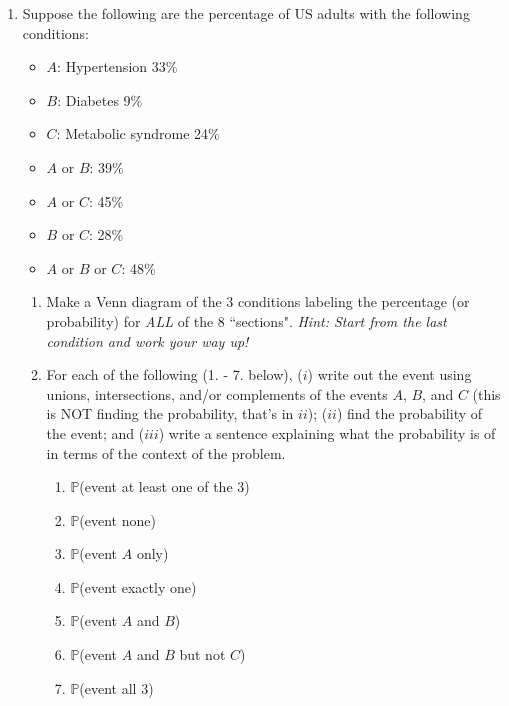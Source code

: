\documentclass[12pt]{article}
\begin{document}
\begin{enumerate}  %

\item \label{NTB_Venn} Suppose the following are the percentage of US adults with the following conditions:
	\begin{itemize}
		\item $A$: Hypertension 33\%
		\item $B$: Diabetes 9\%
		\item $C$: Metabolic syndrome 24\%
		\item $A$ or $B$: 39\%
		\item $A$ or $C$: 45\%
		\item $B$ or $C$: 28\%
		\item $A$ or $B$ or $C$: 48\%
	\end{itemize}
\begin{enumerate}
\item Make a Venn diagram of the 3 conditions labeling the percentage (or probability) for \emph{ALL} of the 8 ``sections".
\emph{Hint: Start from the last condition and work your way up!}
\item For each of the following (1. - 7. below), \newline
($i$) write out the event using unions, intersections, and/or complements of the events $A$, $B$, and $C$ (this is NOT finding the probability, that's in $ii$);  \newline
($ii$) find the probability of the event; and  \newline
($iii$) write a sentence explaining what the probability is of in terms of the context of the problem.
	\begin{enumerate}
		\item $\mathbb{P}$(event at least one of the 3)
		\item $\mathbb{P}$(event none)
		\item $\mathbb{P}$(event $A$ only)
		\item $\mathbb{P}$(event exactly one)
		\item $\mathbb{P}$(event $A$ and $B$)
		\item $\mathbb{P}$(event $A$ and $B$ but not $C$)
		\item $\mathbb{P}$(event all 3)
	\end{enumerate}

\end{enumerate}




\end{enumerate}
\end{document}
